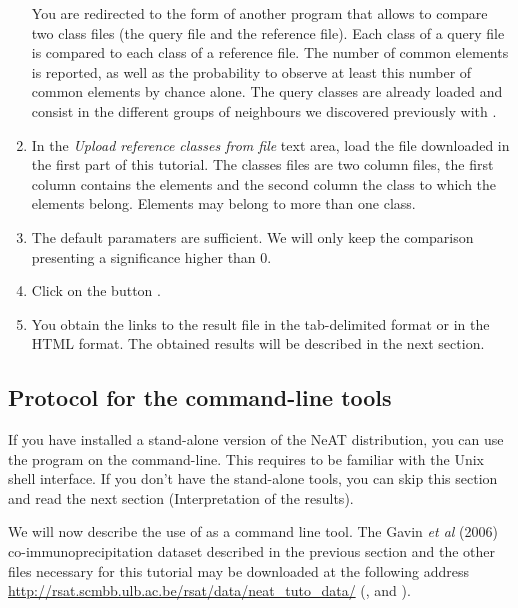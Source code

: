 \begin{enumerate}
You are redirected to the form of another program  that allows to compare two class
files (the query file and the reference file). Each class of a query file is compared to each class of a
reference file. The number of common elements is reported, as well as the probability to observe at least this
number of common elements by chance alone. The query classes are already loaded and consist in the different groups of neighbours we discovered previously with .

\item In the \textit{Upload reference classes from file} text area, load the file  downloaded in the first part of this tutorial. The classes files are two column files, the first column contains the elements and the second column the class to which the elements belong. Elements may belong to more than one class.

\item The default paramaters are sufficient. We will only keep the comparison presenting a significance higher than 0.

\item Click on the button .

\item You obtain the links to the result file in the tab-delimited format or in the HTML format. The obtained results will be described in the next section.


\end{enumerate}

\subsection{Protocol for the command-line tools}

If you have installed a stand-alone version of the NeAT distribution,
you can use the program  on the
command-line. This requires to be familiar with the Unix shell
interface. If you don't have the stand-alone tools, you can skip this
section and read the next section (Interpretation of the results).

We will now describe the use of  as a command line tool. 
The Gavin \textit{et al} (2006) \cite{Gavin2006} co-immunoprecipitation dataset described
in the previous section and the other files necessary for this tutorial 
may be downloaded at the following address \url{http://rsat.scmbb.ulb.ac.be/rsat/data/neat\_tuto\_data/} (,  and ).


